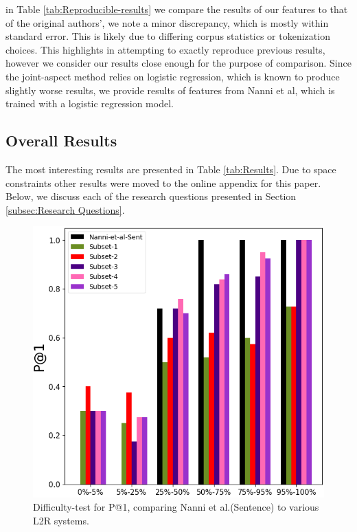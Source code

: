 in Table \ref{tab:Reproducible-results} we compare the results of our features to that of the original authors', we note a minor discrepancy, which is mostly within standard error. This is likely due to differing corpus statistics or tokenization choices. This highlights in attempting to exactly reproduce previous results, however we consider our results close enough for the purpose of comparison. Since the joint-aspect method relies on logistic regression, which is known to produce slightly worse results, we provide results of features from Nanni et al, which is trained with a logistic regression model.

\subsection{Overall Results}
\label{subsec:Results}
The most interesting results are presented in Table \ref{tab:Results}. Due to space constraints other results were moved to the online appendix for this paper. Below, we discuss each of the research questions presented in Section \ref{subsec:Research Questions}.


\begin{figure}
    \centering
    \includegraphics [scale=0.5]{plot-cropped.png}
    \caption{Difficulty-test for P@1, comparing Nanni et al.(Sentence) to various L2R systems.}
    \label{fig:difficulty-plot}
\end{figure}

